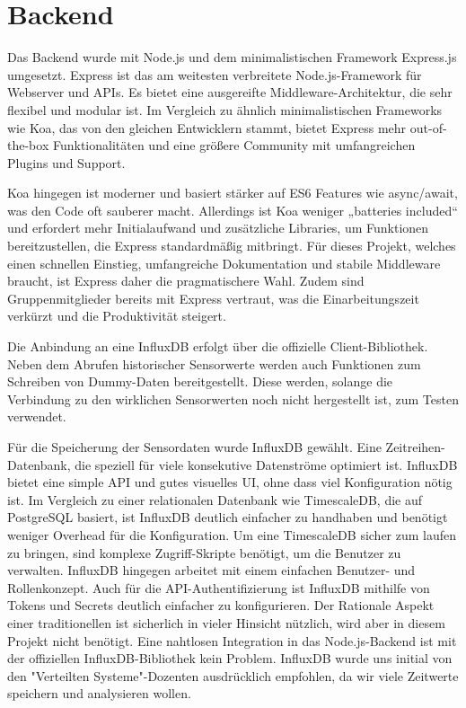\section{Backend}
Das Backend wurde mit Node.js und dem minimalistischen Framework Express.js umgesetzt. 
Express ist das am weitesten verbreitete Node.js-Framework für Webserver und APIs. 
Es bietet eine ausgereifte Middleware-Architektur, die sehr flexibel und modular ist. 
Im Vergleich zu ähnlich minimalistischen Frameworks wie Koa, 
das von den gleichen Entwicklern stammt, 
bietet Express mehr out-of-the-box Funktionalitäten und eine größere Community mit umfangreichen Plugins und Support. \cite{betterstack2025koavsexpress,appventurez2025nodejsframework}

Koa hingegen ist moderner und basiert stärker auf ES6 Features wie async/await, was den Code oft sauberer macht. 
Allerdings ist Koa weniger „batteries included“ und erfordert mehr Initialaufwand und zusätzliche Libraries, 
um Funktionen bereitzustellen, die Express standardmäßig mitbringt. 
Für dieses Projekt, welches einen schnellen Einstieg, umfangreiche Dokumentation und stabile Middleware braucht, 
ist Express daher die pragmatischere Wahl.
Zudem sind Gruppenmitglieder bereits mit Express vertraut, was die Einarbeitungszeit verkürzt und die Produktivität steigert. 

Die Anbindung an eine InfluxDB erfolgt über die offizielle Client-Bibliothek. 
Neben dem Abrufen historischer Sensorwerte werden auch Funktionen zum Schreiben von Dummy-Daten bereitgestellt.
Diese werden, solange die Verbindung zu den wirklichen Sensorwerten noch nicht hergestellt ist, zum Testen verwendet.

Für die Speicherung der Sensordaten wurde InfluxDB gewählt. 
Eine Zeitreihen-Datenbank, die speziell für viele konsekutive Datenströme optimiert ist. 
InfluxDB bietet eine simple API und gutes visuelles UI, ohne dass viel Konfiguration nötig ist.
Im Vergleich zu einer relationalen Datenbank wie TimescaleDB, die auf PostgreSQL basiert,
ist InfluxDB deutlich einfacher zu handhaben und benötigt weniger Overhead für die Konfiguration.
Um eine TimescaleDB sicher zum laufen zu bringen, sind komplexe Zugriff-Skripte benötigt, um die Benutzer zu verwalten.
InfluxDB hingegen arbeitet mit einem einfachen Benutzer- und Rollenkonzept. 
Auch für die API-Authentifizierung ist InfluxDB mithilfe von Tokens und Secrets deutlich einfacher zu konfigurieren.
Der Rationale Aspekt einer traditionellen ist sicherlich in vieler Hinsicht nützlich, wird aber in diesem Projekt nicht benötigt.
Eine nahtlosen Integration in das Node.js-Backend ist mit der offiziellen InfluxDB-Bibliothek kein Problem.
InfluxDB wurde uns initial von den "Verteilten Systeme"-Dozenten ausdrücklich empfohlen, da wir viele Zeitwerte speichern und analysieren wollen.


